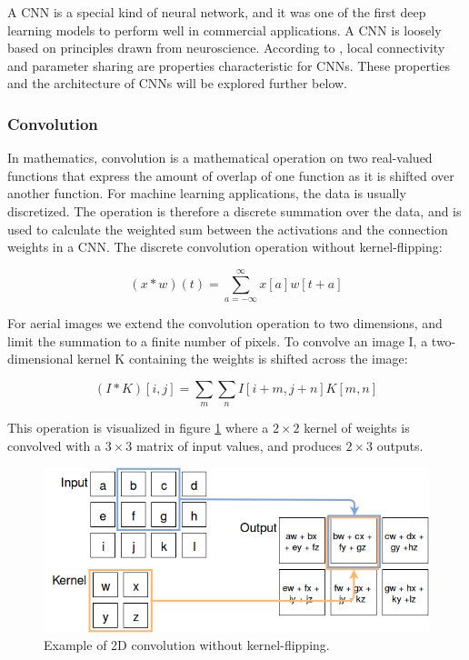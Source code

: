 A \ac{CNN} is a special kind of neural network, and it was one of the first deep learning models to perform well in commercial applications. A \ac{CNN} is loosely based on principles drawn from neuroscience. According to \cite{Bengio_deep_learning_book},  local connectivity and parameter sharing are properties characteristic for \ac{CNN}s. These properties and the architecture of \ac{CNN}s will be explored further below.

\subsubsection{Convolution}
In mathematics, convolution is a mathematical operation on two real-valued functions that express the amount of overlap of one function as it is shifted over another function. For machine learning applications, the data is usually discretized. The operation is therefore a discrete summation over the data, and is used to calculate the weighted sum between the activations and the connection weights in a \ac{CNN}. The discrete convolution operation without kernel-flipping:

$$ (x*w)(t) = \sum\limits_{a=-\infty}^\infty x[a]w[t+a]$$ 

For aerial images we extend the convolution operation to two dimensions, and limit the summation to a finite number of pixels. To convolve an image I, a two-dimensional kernel K containing the weights is shifted across the image:  

$$ (I*K)[i,j] = \sum\limits_{m}\sum\limits_{n} I[i+m, j+n]K[m,n]$$ 

This operation is  visualized in figure \ref{fig:convolution} where a $2 \times 2$ kernel of weights is convolved with a $3 \times 3$ matrix of input values, and produces $2 \times 3$ outputs. 

\begin{figure}[t]
\begin{center}
\includegraphics[width=0.8\columnwidth]{figs/convolution.png}
\caption[Convolution example]{Example of 2D convolution without kernel-flipping.}
\label{fig:convolution}
\end{center}
\end{figure}



